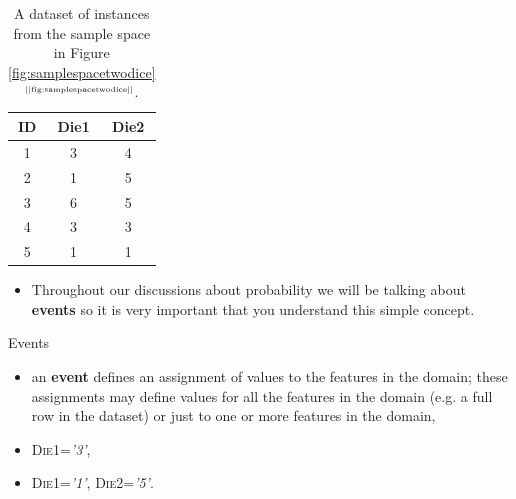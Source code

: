 \documentclass[xcolor={table}]{beamer}
\newcommand{\keyword}[1]{\alert{\textbf{#1}}\index{#1}}
\newcommand{\featN}[1]{\textsc{#1}}
\newcommand{\featL}[1]{\textit{'#1'}}
\newcommand{\ourRef}[1]{\ref{#1} $^{\text{\tiny[\pageref{#1}]}}$}
\begin{document}
 \begin{frame} 
\begin{table}
\centering
	\begin{footnotesize}
	\begin{tabular}{c c c}
	\hline
	\textbf{ID} & \textbf{Die1} & \textbf{Die2}\\
	\hline
		1 & 3 & 4\\
	      2 & 1 & 5\\
           3 & 6 & 5\\
           4 & 3 & 3\\
           5 & 1 & 1\\
	\hline
	\end{tabular}
	\end{footnotesize}
	\label{table:dicedataset}
	\caption{A dataset of instances from the sample space in Figure \ourRef{fig:samplespacetwodice}.}
\end{table}
\end{frame} 

 \begin{frame} 
\begin{itemize}
	\item Throughout our discussions about probability we will be talking about \keyword{events} so it is very important that you understand this simple concept.
\end{itemize}
\begin{alertblock}{Events}
\begin{itemize}
\item an \keyword{event} defines an assignment of values to the features in the domain; these assignments may define values for all the features in the domain (e.g. a full row in the dataset) or just to one or more features in the domain, 
\end{itemize}
\end{alertblock}
\begin{example}
\begin{itemize}
	\item \featN{Die1}=\featL{3}, 
	\item \featN{Die1}=\featL{1}, \featN{Die2}=\featL{5}.
\end{itemize}
\end{example}
\end{frame} 
\end{document}

